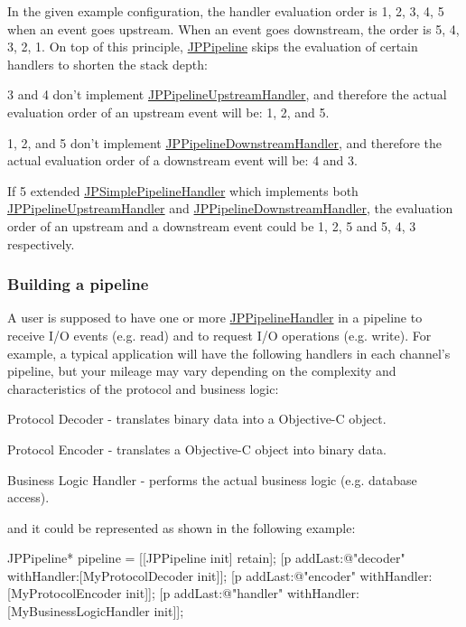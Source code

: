 In the given example configuration, the handler evaluation order is 1, 2, 3, 4, 5 when an event goes upstream. When an event goes downstream, the order is 5, 4, 3, 2, 1. On top of this principle, \hyperlink{a00019}{JPPipeline} skips the evaluation of certain handlers to shorten the stack depth: 
\begin{DoxyItemize}
\item 3 and 4 don't implement \hyperlink{a00035}{JPPipelineUpstreamHandler}, and therefore the actual evaluation order of an upstream event will be: 1, 2, and 5. 
\item 1, 2, and 5 don't implement \hyperlink{a00021}{JPPipelineDownstreamHandler}, and therefore the actual evaluation order of a downstream event will be: 4 and 3. 
\item If 5 extended \hyperlink{a00038}{JPSimplePipelineHandler} which implements both \hyperlink{a00035}{JPPipelineUpstreamHandler} and \hyperlink{a00021}{JPPipelineDownstreamHandler}, the evaluation order of an upstream and a downstream event could be 1, 2, 5 and 5, 4, 3 respectively. 
\end{DoxyItemize}

\subsubsection*{Building a pipeline}

A user is supposed to have one or more \hyperlink{a00029}{JPPipelineHandler} in a pipeline to receive I/O events (e.g. read) and to request I/O operations (e.g. write). For example, a typical application will have the following handlers in each channel's pipeline, but your mileage may vary depending on the complexity and characteristics of the protocol and business logic:


\begin{DoxyEnumerate}
\item Protocol Decoder -\/ translates binary data into a Objective-\/C object. 
\item Protocol Encoder -\/ translates a Objective-\/C object into binary data. 
\item Business Logic Handler -\/ performs the actual business logic (e.g. database access). 
\end{DoxyEnumerate}

and it could be represented as shown in the following example:


\begin{DoxyCode}
 JPPipeline* pipeline = [[JPPipeline init] retain];
 [p addLast:@"decoder" withHandler:[MyProtocolDecoder init]];
 [p addLast:@"encoder" withHandler:[MyProtocolEncoder init]];
 [p addLast:@"handler" withHandler:[MyBusinessLogicHandler init]];
\end{DoxyCode}


